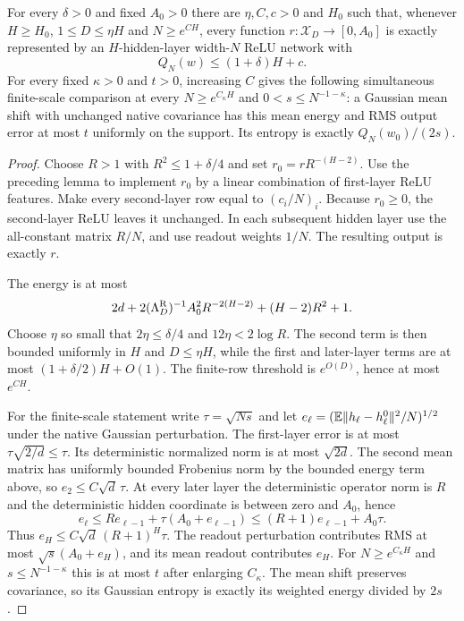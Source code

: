 \begin{theorem}
For every $\delta>0$ and fixed $A_0>0$ there are $\eta,C,c>0$ and $H_0$ such that, whenever $H\ge H_0$, $1\le D\le\eta H$ and $N\ge e^{CH}$, every function
$r:\mathcal X_D\to[0,A_0]$ is exactly represented by an $H$-hidden-layer width-$N$ ReLU network with
\[
 Q_N(w)\le(1+\delta)H+c.
\]
For every fixed $\kappa>0$ and $t>0$, increasing $C$ gives the following simultaneous finite-scale comparison at every $N\ge e^{C_\kappa H}$ and $0<s\le N^{-1-\kappa}$: a Gaussian mean shift with unchanged native covariance has this mean energy and RMS output error at most $t$ uniformly on the support. Its entropy is exactly $Q_N(w_0)/(2s)$.
\end{theorem}
\begin{proof}
Choose $R>1$ with $R^2\le1+\delta/4$ and set
$r_0=r R^{-(H-2)}$. Use the preceding lemma to implement $r_0$ by a linear combination of first-layer ReLU features. Make every second-layer row equal to $(c_i/N)_i$. Because $r_0\ge0$, the second-layer ReLU leaves it unchanged. In each subsequent hidden layer use the all-constant matrix $R/N$, and use readout weights $1/N$. The resulting output is exactly $r$.

The energy is at most
\[
 2d+2(\Lambda_D^{\rm R})^{-1}A_0^2R^{-2(H-2)}
                  +(H-2)R^2+1.
\]
Choose $\eta$ so small that $2\eta\le\delta/4$ and
$12\eta<2\log R$. The second term is then bounded uniformly in $H$ and $D\le\eta H$, while the first and later-layer terms are at most $(1+\delta/2)H+O(1)$. The finite-row threshold is $e^{O(D)}$, hence at most $e^{CH}$.

For the finite-scale statement write $\tau=\sqrt{Ns}$ and let
$e_\ell=(\mathbb E\|h_\ell-h_\ell^0\|^2/N)^{1/2}$ under the native Gaussian perturbation. The first-layer error is at most $\tau\sqrt{2/d}\le\tau$. Its deterministic normalized norm is at most $\sqrt{2d}$. The second mean matrix has uniformly bounded Frobenius norm by the bounded energy term above, so $e_2\le C\sqrt d\,\tau$.
At every later layer the deterministic operator norm is $R$ and the deterministic hidden coordinate is between zero and $A_0$, hence
\[
 e_\ell\le R e_{\ell-1}+\tau(A_0+e_{\ell-1})
       \le(R+1)e_{\ell-1}+A_0\tau.
\]
Thus $e_H\le C\sqrt d\,(R+1)^H\tau$.
The readout perturbation contributes RMS at most
$\sqrt s(A_0+e_H)$, and its mean readout contributes $e_H$.
For $N\ge e^{C_\kappa H}$ and $s\le N^{-1-\kappa}$ this is at most $t$ after enlarging $C_\kappa$. The mean shift preserves covariance, so its Gaussian entropy is exactly its weighted energy divided by $2s$.
\end{proof}

